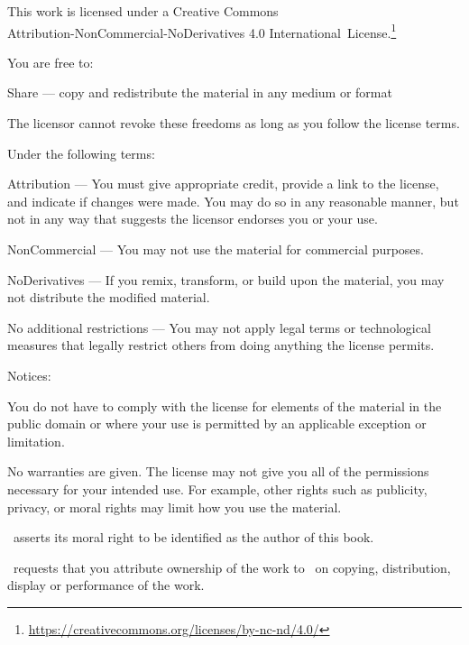 \cleartorecto
\thispagestyle{plain}

{\fontsize{9}{11}\selectfont\setlength{\parindent}{0pt}%
\raggedright\label{copyright-details}
\setlength{\parskip}{7pt}

{\centering

{\LARGE\ccbyncnd}

This work is licensed under a Creative Commons\\
Attribution-NonCommercial-NoDerivatives 4.0 International~License.\footnote{%
\href{https://creativecommons.org/licenses/by-nc-nd/4.0/}{https://creativecommons.org/licenses/by-nc-nd/4.0/}}

}

You are free to:

\begin{packeditemize}
\item Share — copy and redistribute the material in any medium or format
\end{packeditemize}

The licensor cannot revoke these freedoms as long as you follow the license terms.

Under the following terms:

\begin{packeditemize}
\item Attribution — You must give appropriate credit, provide a link to the license, and indicate if changes were made. You may do so in any reasonable manner, but not in any way that suggests the licensor endorses you or your use.
\item NonCommercial — You may not use the material for commercial purposes.
\item NoDerivatives — If you remix, transform, or build upon the material, you may not distribute the modified material.
\end{packeditemize}

No additional restrictions — You may not apply legal terms or technological measures that legally restrict others from doing anything the license permits.

Notices:

You do not have to comply with the license for elements of the material in the public domain or where your use is permitted by an applicable exception or limitation.

No warranties are given. The license may not give you all of the permissions necessary for your intended use. For example, other rights such as publicity, privacy, or moral rights may limit how you use the material.


\thePublisher\ asserts its moral right to be identified as the author of this book.

\thePublisher\ requests that you attribute ownership of the work to \thePublisher\ on copying, distribution, display or performance of the work.

}
